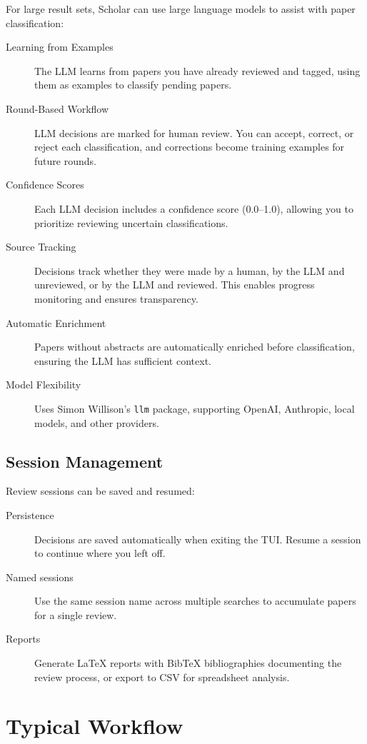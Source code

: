 For large result sets, Scholar can use large language models to assist with 
paper classification:
\begin{description}
\item[Learning from Examples] The LLM learns from papers you have already 
  reviewed and tagged, using them as examples to classify pending papers.
\item[Round-Based Workflow] LLM decisions are marked for human review.
  You can accept, correct, or reject each classification, and corrections 
  become training examples for future rounds.
\item[Confidence Scores] Each LLM decision includes a confidence score 
  (0.0--1.0), allowing you to prioritize reviewing uncertain classifications.
\item[Source Tracking] Decisions track whether they were made by a human, 
  by the LLM and unreviewed, or by the LLM and reviewed.
  This enables progress monitoring and ensures transparency.
\item[Automatic Enrichment] Papers without abstracts are automatically 
  enriched before classification, ensuring the LLM has sufficient context.
\item[Model Flexibility] Uses Simon Willison's \texttt{llm} package, 
  supporting OpenAI, Anthropic, local models, and other providers.
\end{description}

\subsection{Session Management}

Review sessions can be saved and resumed:
\begin{description}
\item[Persistence] Decisions are saved automatically when exiting the TUI.
  Resume a session to continue where you left off.
\item[Named sessions] Use the same session name across multiple searches to 
  accumulate papers for a single review.
\item[Reports] Generate \LaTeX{} reports with BibTeX bibliographies documenting 
  the review process, or export to CSV for spreadsheet analysis.
\end{description}


\section{Typical Workflow}


